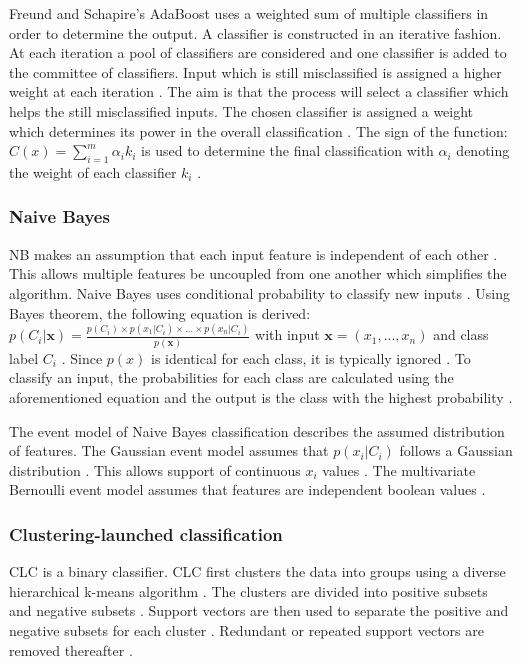\documentclass{sig-alternate-05-2015}
\begin{document}
	Freund and Schapire's \cite{FREUND1997119} AdaBoost uses a weighted sum of multiple classifiers in order to determine the output. A classifier is constructed in an iterative fashion. At each iteration a pool of classifiers are considered and one classifier is added to the committee of classifiers. Input which is still misclassified is assigned a higher weight at each iteration \cite{Bergstra2006, rojas2009adaboost}. The aim is that the process will select a classifier which helps the still misclassified inputs. The chosen classifier is assigned a weight which determines its power in the overall classification \cite{Bergstra2006, rojas2009adaboost}. The sign of the function: $C(x) = \sum_{i=1}^{m} \alpha_i k_i$ is used to determine the final classification with $\alpha_i$ denoting the weight of each classifier $k_i$ \cite{Bergstra2006}. 
	
	\subsubsection{Naive Bayes}
	NB makes an assumption that each input feature is independent of each other \cite{Lewis1998, rish2001empirical}. This allows multiple features be uncoupled from one another which simplifies the algorithm. Naive Bayes uses conditional probability to classify new inputs \cite{Lewis1998}. Using Bayes theorem, the following equation is derived: $p(C_i|\textbf{x}) = \frac{p(C_i) \times p(x_1|C_i) \times...\times p(x_n|C_i)}{p(\textbf{x})}$ with input $\textbf{x} = (x_1,...,x_n)$ and class label $C_i$ \cite{Lewis1998, rish2001empirical}. Since $p(\textit{x})$ is identical for each class, it is typically ignored \cite{rish2001empirical}. To classify an input, the probabilities for each class are calculated using the aforementioned equation and the output is the class with the highest probability \cite{Lewis1998}.
	
	The event model of Naive Bayes classification describes the assumed distribution of features. The Gaussian event model assumes that $p(x_i|C_i)$ follows a Gaussian distribution \cite{John:1995:ECD:2074158.2074196}. This allows support of continuous $x_i$ values \cite{John:1995:ECD:2074158.2074196}. The multivariate Bernoulli event model assumes that features are independent boolean values \cite{mccallum1998comparison}.
	
	\subsubsection{Clustering-launched classification}
	CLC is a binary classifier. CLC first clusters the data into groups using a diverse hierarchical k-means algorithm \cite{Luo20097562}. The clusters are divided into positive subsets and negative subsets \cite{Luo20097562}. Support vectors are then used to separate the positive and negative subsets for each cluster \cite{Luo20097562}. Redundant or repeated support vectors are removed thereafter \cite{Luo20097562}.
	
\end{document}

